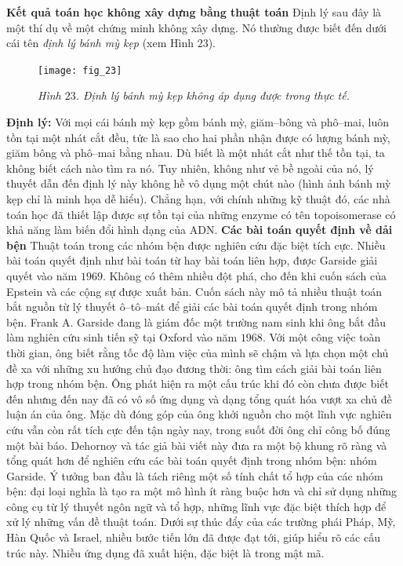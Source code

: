 \begin{multicols}{2}
	\vskip 0.1cm
	\textbf{\color{duongvaotoanhoc}Kết quả toán học không xây dựng bằng thuật toán}
	\vskip 0.1cm
	Định lý sau đây là một thí dụ về một chứng minh không xây dựng. Nó thường được biết đến dưới cái tên \textit{định lý bánh mỳ kẹp} (xem Hình $23$).
	\begin{figure}[H]
		\vspace*{-10pt}
		\centering
		\captionsetup{labelformat= empty, justification=centering}
		\texttt{[image: fig\_23]}
		\caption{\small\textit{\color{duongvaotoanhoc}Hình $23$. Định lý bánh mỳ kẹp không áp dụng được trong thực tế.}}
		\vspace*{-10pt}
	\end{figure}
	\textbf{\color{duongvaotoanhoc}Định lý:} Với mọi cái bánh mỳ kẹp gồm bánh mỳ, giăm--bông và phô--mai, luôn tồn tại một nhát cắt đều, tức là sao cho hai phần nhận được có lượng bánh mỳ, giăm bông và phô--mai bằng nhau.
	\vskip 0.1cm
	Dù biết là một nhát cắt như thế tồn tại, ta không biết cách nào tìm ra nó. Tuy nhiên, không như vẻ bề ngoài của nó, lý thuyết dẫn đến định lý này không hề vô dụng một chút nào (hình ảnh bánh mỳ kẹp chỉ là minh họa dễ hiểu). Chẳng hạn, với chính những kỹ thuật đó, các nhà toán học đã thiết lập được sự tồn tại của những enzyme có tên topoisomerase có khả năng làm biến đổi hình dạng của ADN.
	\vskip 0.1cm
	\textbf{\color{duongvaotoanhoc}Các bài toán quyết định về dải bện}
	\vskip 0.1cm
	Thuật toán trong các nhóm bện được nghiên cứu đặc biệt tích cực. Nhiều bài toán quyết định như bài toán từ hay bài toán liên hợp, được Garside giải quyết vào năm $1969$. Không có thêm nhiều đột phá, cho đến khi cuốn sách của Epstein và các cộng sự được xuất bản. Cuốn sách này mô tả nhiều thuật toán bắt nguồn từ lý thuyết ô--tô--mát để giải các bài toán quyết định trong nhóm bện.
	\vskip 0.1cm
		Frank A. Garside đang là giám đốc một trường nam sinh khi ông bắt đầu làm nghiên cứu sinh tiến sỹ tại Oxford vào năm $1968$. Với một công việc toàn thời gian, ông biết rằng tốc độ làm việc của mình sẽ chậm và lựa chọn một chủ đề xa với những xu hướng chủ đạo đương thời: ông tìm cách giải bài toán liên hợp trong nhóm bện. Ông phát hiện ra một cấu trúc khi đó còn chưa được biết đến nhưng đến nay đã có vô số ứng dụng và dạng tổng quát hóa vượt xa chủ đề luận án của ông. Mặc dù đóng góp của ông khởi nguồn cho một lĩnh vực nghiên cứu vẫn còn rất tích cực đến tận ngày nay, trong suốt đời ông chỉ công bố đúng một bài báo.
	\vskip 0.1cm
	Dehornoy và tác giả bài viết này đưa ra một bộ khung rõ ràng và tổng quát hơn để nghiên cứu các bài toán quyết định trong nhóm bện: nhóm Garside. Ý tưởng ban đầu là tách riêng một số tính chất tổ hợp của các nhóm bện: đại loại nghĩa là tạo ra một mô hình ít ràng buộc hơn và chỉ sử dụng những công cụ từ lý thuyết ngôn ngữ và tổ hợp, những lĩnh vực đặc biệt thích hợp để xử lý những vấn đề thuật toán. Dưới sự thúc đẩy của các trường phái Pháp, Mỹ, Hàn Quốc và Israel, nhiều bước tiến lớn đã được đạt tới, giúp hiểu rõ các cấu trúc này. Nhiều ứng dụng đã xuất hiện, đặc biệt là trong mật mã.

\end{multicols}
